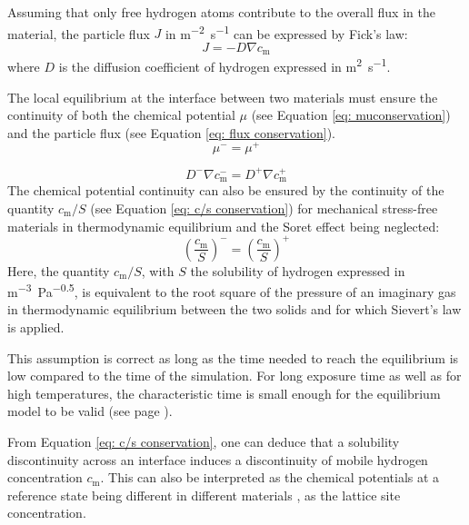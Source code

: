 Assuming that only free hydrogen atoms contribute to the overall flux in the material, the particle flux $J$ in \si{m^{-2}.s^{-1}} can be expressed by Fick's law:
\begin{equation}
    J = - D \nabla c_\mathrm{m}
\end{equation}
where $D$ is the diffusion coefficient of hydrogen expressed in \si{m^{2}.s^{-1}}. 


The local equilibrium at the interface between two materials must ensure  the continuity of both the chemical potential $\mu$ (see Equation \ref{eq: muconservation}) and the particle flux (see Equation \ref{eq: flux conservation}).
\begin{equation}
    \mu^- = \mu^+  \label{eq: muconservation}  
\end{equation}
    
\begin{equation}
    D^- \nabla c_\mathrm{m}^- = D^+ \nabla c_\mathrm{m}^+ \label{eq: flux conservation} 
\end{equation}
The chemical potential continuity can also be ensured by the continuity of the quantity $c_\mathrm{m}/S$ (see Equation \ref{eq: c/s conservation}) for mechanical stress-free materials in thermodynamic equilibrium and the Soret effect being neglected:
\begin{equation}
    \left(\frac{c_\mathrm{m}}{S}\right)^- = \left(\frac{c_\mathrm{m}}{S}\right)^+  \label{eq: c/s conservation}  
\end{equation}
Here, the quantity $c_\mathrm{m}/S$, with $S$ the solubility of hydrogen expressed in \si{m^{-3}.Pa^{-0.5}}, is equivalent to the root square of the pressure of an imaginary gas in thermodynamic equilibrium between the two solids and for which Sievert's law is applied.  

This assumption is correct as long as the time needed to reach the equilibrium is low compared to the time of the simulation.
For long exposure time as well as for high temperatures, the characteristic time is small enough for the equilibrium model to be valid (see page ).

From Equation \ref{eq: c/s conservation}, one can deduce that a solubility discontinuity across an interface induces a discontinuity of mobile hydrogen concentration $c_\mathrm{m}$.
This can also be interpreted as the chemical potentials at a reference state being different in different materials , as the lattice site concentration.

